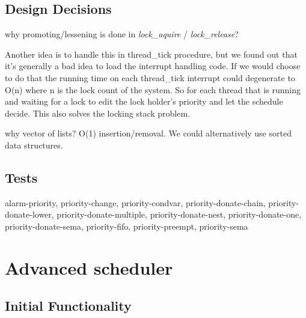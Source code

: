 

    \subsection{Design Decisions}

	why promoting/lessening is done in \textit{lock\_aquire} / \textit{lock\_release}?

	Another idea is to handle this in thread\_tick procedure, but we found out that it's generally a bad idea to load the interrupt handling code. If we would choose to do that the running time on each thread\_tick interrupt could degenerate to O(n) where n is the lock count of the system. So for each thread that is running and waiting for a lock to edit the lock holder's priority and let the schedule decide. This also solves the locking stack problem.
	
	why vector of lists?
O(1) insertion/removal. We could alternatively use sorted data structures.

    \subsection{Tests}

	alarm-priority, priority-change, priority-condvar, priority-donate-chain, priority-donate-lower, priority-donate-multiple, priority-donate-nest, priority-donate-one, priority-donate-sema, priority-fifo, priority-preempt, priority-sema

\section{Advanced scheduler}

    \subsection{Initial Functionality}

